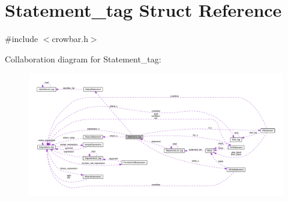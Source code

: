 \hypertarget{struct_statement__tag}{}\section{Statement\+\_\+tag Struct Reference}
\label{struct_statement__tag}


{\ttfamily \#include $<$crowbar.\+h$>$}



Collaboration diagram for Statement\+\_\+tag\+:\nopagebreak
\begin{figure}[H]
\begin{center}
\leavevmode
\includegraphics[width=350pt]{struct_statement__tag__coll__graph}
\end{center}
\end{figure}
